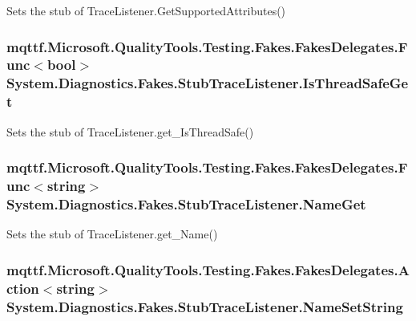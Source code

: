Sets the stub of Trace\-Listener.\-Get\-Supported\-Attributes()

\hypertarget{class_system_1_1_diagnostics_1_1_fakes_1_1_stub_trace_listener_ac83c69204f8d645cef263b301d472b64}{
\subsubsection[{Is\-Thread\-Safe\-Get}]{\setlength{\rightskip}{0pt plus 5cm}mqttf.\-Microsoft.\-Quality\-Tools.\-Testing.\-Fakes.\-Fakes\-Delegates.\-Func$<$bool$>$ System.\-Diagnostics.\-Fakes.\-Stub\-Trace\-Listener.\-Is\-Thread\-Safe\-Get}}\label{class_system_1_1_diagnostics_1_1_fakes_1_1_stub_trace_listener_ac83c69204f8d645cef263b301d472b64}


Sets the stub of Trace\-Listener.\-get\-\_\-\-Is\-Thread\-Safe()

\hypertarget{class_system_1_1_diagnostics_1_1_fakes_1_1_stub_trace_listener_ac09c6738f8d307db72f87fe414e46c5a}{
\subsubsection[{Name\-Get}]{\setlength{\rightskip}{0pt plus 5cm}mqttf.\-Microsoft.\-Quality\-Tools.\-Testing.\-Fakes.\-Fakes\-Delegates.\-Func$<$string$>$ System.\-Diagnostics.\-Fakes.\-Stub\-Trace\-Listener.\-Name\-Get}}\label{class_system_1_1_diagnostics_1_1_fakes_1_1_stub_trace_listener_ac09c6738f8d307db72f87fe414e46c5a}


Sets the stub of Trace\-Listener.\-get\-\_\-\-Name()

\hypertarget{class_system_1_1_diagnostics_1_1_fakes_1_1_stub_trace_listener_a3840bfd0718d68b475e4934749141b93}{
\subsubsection[{Name\-Set\-String}]{\setlength{\rightskip}{0pt plus 5cm}mqttf.\-Microsoft.\-Quality\-Tools.\-Testing.\-Fakes.\-Fakes\-Delegates.\-Action$<$string$>$ System.\-Diagnostics.\-Fakes.\-Stub\-Trace\-Listener.\-Name\-Set\-String}}\label{class_system_1_1_diagnostics_1_1_fakes_1_1_stub_trace_listener_a3840bfd0718d68b475e4934749141b93}


